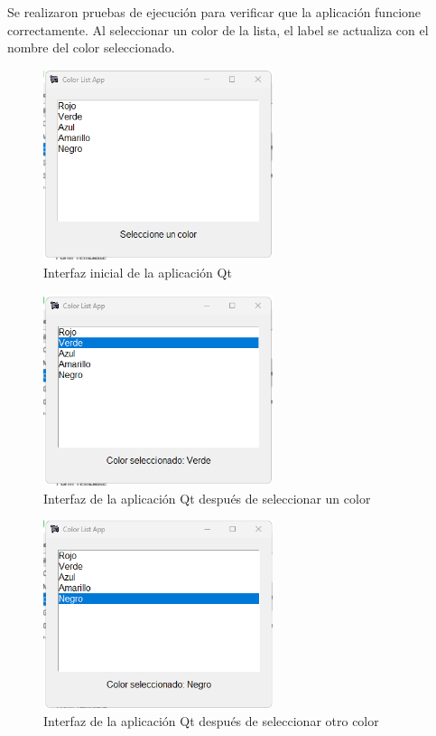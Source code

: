 Se realizaron pruebas de ejecución para verificar que la aplicación funcione correctamente. Al seleccionar un color de la lista, el label se actualiza con el nombre del color seleccionado.

\begin{figure}[H]
    \centering
    \includegraphics[width=0.6\textwidth]{img/Prueba01.png}
    \caption{Interfaz inicial de la aplicación Qt}
    \label{fig:qt_app}
\end{figure}

\begin{figure}[H]
    \centering
    \includegraphics[width=0.6\textwidth]{img/Prueba02.png}
    \caption{Interfaz de la aplicación Qt después de seleccionar un color}
    \label{fig:qt_app_selected}
\end{figure}

\begin{figure}[H]
    \centering
    \includegraphics[width=0.6\textwidth]{img/Prueba03.png}
    \caption{Interfaz de la aplicación Qt después de seleccionar otro color}
    \label{fig:qt_app_selected2}
\end{figure}




